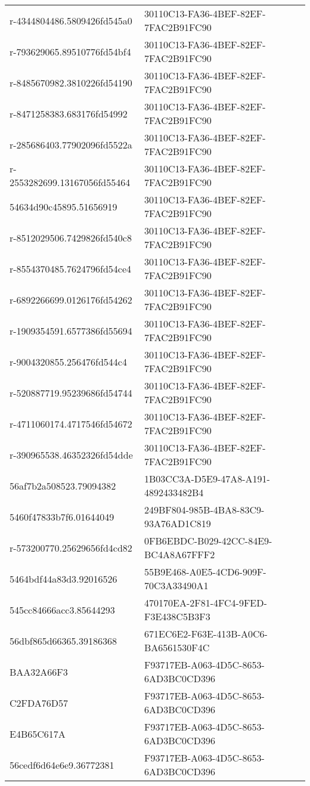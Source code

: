 \begin{tabular}{ll}
r-4344804486.5809426fd545a0 & 30110C13-FA36-4BEF-82EF-7FAC2B91FC90 \\
r-793629065.89510776fd54bf4 & 30110C13-FA36-4BEF-82EF-7FAC2B91FC90 \\
r-8485670982.3810226fd54190 & 30110C13-FA36-4BEF-82EF-7FAC2B91FC90 \\
r-8471258383.683176fd54992 & 30110C13-FA36-4BEF-82EF-7FAC2B91FC90 \\
r-285686403.77902096fd5522a & 30110C13-FA36-4BEF-82EF-7FAC2B91FC90 \\
r-2553282699.13167056fd55464 & 30110C13-FA36-4BEF-82EF-7FAC2B91FC90 \\
54634d90c45895.51656919 & 30110C13-FA36-4BEF-82EF-7FAC2B91FC90 \\
r-8512029506.7429826fd540c8 & 30110C13-FA36-4BEF-82EF-7FAC2B91FC90 \\
r-8554370485.7624796fd54ce4 & 30110C13-FA36-4BEF-82EF-7FAC2B91FC90 \\
r-6892266699.0126176fd54262 & 30110C13-FA36-4BEF-82EF-7FAC2B91FC90 \\
r-1909354591.6577386fd55694 & 30110C13-FA36-4BEF-82EF-7FAC2B91FC90 \\
r-9004320855.256476fd544c4 & 30110C13-FA36-4BEF-82EF-7FAC2B91FC90 \\
r-520887719.95239686fd54744 & 30110C13-FA36-4BEF-82EF-7FAC2B91FC90 \\
r-4711060174.4717546fd54672 & 30110C13-FA36-4BEF-82EF-7FAC2B91FC90 \\
r-390965538.46352326fd54dde & 30110C13-FA36-4BEF-82EF-7FAC2B91FC90 \\
56af7b2a508523.79094382 & 1B03CC3A-D5E9-47A8-A191-4892433482B4 \\
5460f47833b7f6.01644049 & 249BF804-985B-4BA8-83C9-93A76AD1C819 \\
r-573200770.25629656fd4cd82 & 0FB6EBDC-B029-42CC-84E9-BC4A8A67FFF2 \\
5464bdf44a83d3.92016526 & 55B9E468-A0E5-4CD6-909F-70C3A33490A1 \\
545cc84666acc3.85644293 & 470170EA-2F81-4FC4-9FED-F3E438C5B3F3 \\
56dbf865d66365.39186368 & 671EC6E2-F63E-413B-A0C6-BA6561530F4C \\
BAA32A66F3 & F93717EB-A063-4D5C-8653-6AD3BC0CD396 \\
C2FDA76D57 & F93717EB-A063-4D5C-8653-6AD3BC0CD396 \\
E4B65C617A & F93717EB-A063-4D5C-8653-6AD3BC0CD396 \\
56cedf6d64e6e9.36772381 & F93717EB-A063-4D5C-8653-6AD3BC0CD396 \\

\end{tabular}
